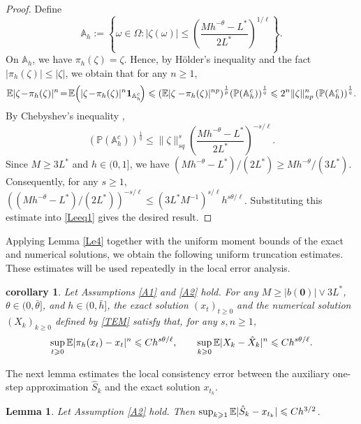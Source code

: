 \documentclass[aap]{imsart}
\theoremstyle{plain}
\newtheorem{lemma}[theorem]{Lemma}
\newtheorem{corollary}[theorem]{corollary}
\theoremstyle{definition}
\begin{document}
	\begin{proof}
		Define
		$$\mathbb{A}_h := \left\{\omega\in\Omega: |\zeta(\omega)|\leqslant \left(\frac{Mh^{-\theta}-L^*}{2L^*}\right)^{1/\ell}\right\}.$$
		On \(\mathbb A_h\), we have \(\pi_h(\zeta)=\zeta\). Hence, by H{\"o}lder's inequality \cite[p.5]{Mao} and the fact $|\pi_h(\zeta)|\leqslant |\zeta|$, we obtain that for any $n\geqslant 1$,
		\begin{equation}\label{Leeq1}
			\E|\zeta\!-\!\pi_h(\zeta)|^n \!=\! \E\!\left(|\zeta\!-\!\pi_h(\zeta)|^n\1_{\mathbb{A}_h^c}\!\right) \leqslant \left(\E |\zeta-\!\pi_h(\zeta)|^{np}\right)^\frac{1}{p}\!\left(\mathbb{P}(\mathbb{A}_h^c)\right)^{\frac{1}{q}}\leqslant 2^n \|\zeta\|^n_{np}\left(\mathbb{P}(\mathbb{A}_h^c)\right)^{\frac{1}{q}}\!.
		\end{equation}
		By Chebyshev's inequality \cite[p.5]{Mao}, 
		$$\left(\mathbb{P}(\mathbb{A}_h^c)\right)^{\frac{1}{q}}\leqslant \|\zeta\|_{sq}^s\left(\frac{Mh^{-\theta}-L^*}{2L^*}\right)^{-s/\ell}.$$
		Since \(M\geqslant3L^*\) and \(h\in(0,1]\), we have
		$(Mh^{-\theta}-L^*)/(2L^*)\geqslant Mh^{-\theta}/(3L^*).$
		Consequently, for any $s\geqslant 1$, $\left((Mh^{-\theta}-L^*)/(2L^*)\right)^{-s/\ell}\leqslant \left(3L^*M^{-1}\right)^{s/\ell}h^{s\theta/\ell}$.
		Substituting this estimate into \eqref{Leeq1} gives the desired result.
	\end{proof}
	Applying Lemma \ref{Le4} together with the uniform moment bounds of the exact
	and numerical solutions, we obtain the following uniform truncation estimates.
	These estimates will be used repeatedly in the local error analysis.
	\begin{corollary}\label{co2}
		Let Assumptions \ref{A1} and \ref{A2} hold. For any
		\(M\geqslant |b(\mathbf{0})|\vee 3L^*\), \(\theta\in(0,\bar{\theta}]\), and
		\(h\in(0,\bar h]\), the exact solution \((x_t)_{t\geqslant0}\) and the numerical
		solution \((X_k)_{k\geqslant0}\) defined by \eqref{TEM} satisfy that, for any
		\(s,n\geqslant1\),
		\[
		\sup_{t\geqslant0}\mathbb{E}|\pi_h(x_t)-x_t|^n
		\leqslant
		Ch^{s\theta/\ell},
		\qquad
		\sup_{k\geqslant0}\mathbb{E}|X_k-\hat X_k|^n
		\leqslant
		Ch^{s\theta/\ell}.
		\]
	\end{corollary}
	
The next lemma estimates the local consistency error between the auxiliary
one-step approximation \(\hat S_k\) and the exact solution \(x_{t_k}\).
 \begin{lemma}\label{Le5}
 	Let Assumption \ref{A2} hold. Then \(\sup_{k\geqslant1}\mathbb{E}|\hat S_k-x_{t_k}|
 	\leqslant
 	Ch^{3/2}\).
 \end{lemma}
 
\end{document}
